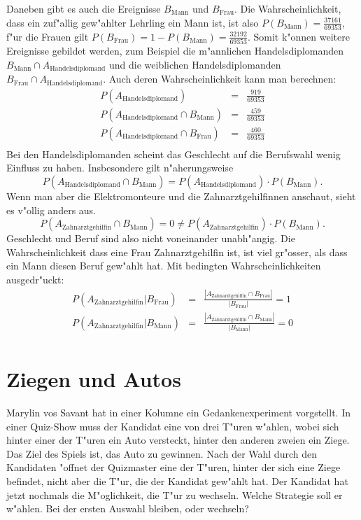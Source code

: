 Daneben gibt es auch die Ereignisse $B_{\text{Mann}}$ und $B_{\text{Frau}}$.
Die Wahrscheinlichkeit, dass ein zuf"allig gew"ahlter Lehrling ein Mann ist,
ist also $P(B_{\text{Mann}})=\frac{37161}{69353}$, f"ur die Frauen gilt
$P(B_{\text{Frau}})=1-P(B_{\text{Mann}})=\frac{32192}{69353}$.
Somit k"onnen weitere Ereignisse gebildet werden, zum Beispiel die
m"annlichen Handelsdiplomanden
$B_{\text{Mann}}\cap A_{\text{Handelsdiplomand}}$ und die
weiblichen Handelsdiplomanden
$B_{\text{Frau}}\cap A_{\text{Handelsdiplomand}}$.
Auch deren Wahrscheinlichkeit kann man berechnen:
\begin{eqnarray*}
P(A_{\text{Handelsdiplomand}})&=&\frac{919}{69353}\\
P(A_{\text{Handelsdiplomand}}\cap B_{\text{Mann}})&=&\frac{459}{69353}\\
P(A_{\text{Handelsdiplomand}}\cap B_{\text{Frau}})&=&\frac{460}{69353}\\
\end{eqnarray*}
Bei den Handelsdiplomanden scheint das Geschlecht auf die Berufswahl
wenig Einfluss zu haben. Insbesondere gilt n"aherungsweise
\[
P(A_{\text{Handelsdiplomand}}\cap B_{\text{Mann}})=P(A_{\text{Handelsdiplomand}})\cdot P(B_{\text{Mann}}).
\]
Wenn man aber die Elektromonteure und die Zahnarztgehilfinnen anschaut,
sieht es v"ollig anders aus.
\[
P(A_{\text{Zahnarztgehilfin}}\cap B_{\text{Mann}})=0\ne P(A_{\text{Zahnarztgehilfin}})\cdot P(B_{\text{Mann}}).
\]
Geschlecht und Beruf sind also nicht voneinander unabh"angig.
Die Wahrscheinlichkeit dass eine Frau Zahnarztgehilfin ist, ist viel
gr"osser, als dass ein Mann diesen Beruf gew"ahlt hat. Mit bedingten
Wahrscheinlichkeiten ausgedr"uckt:
\begin{eqnarray*}
P(A_{\text{Zahnarztgehilfin}}|B_{\text{Frau}})&=&\frac{|A_{\text{Zahnarztgehilfin}}\cap B_{\text{Frau}}|}{|B_{\text{Frau}}|}=1\\
P(A_{\text{Zahnarztgehilfin}}|B_{\text{Mann}})&=&\frac{|A_{\text{Zahnarztgehilfin}}\cap B_{\text{Mann}}|}{|B_{\text{Mann}}|}=0\\
\end{eqnarray*}

\section{Ziegen und Autos\label{ziegen:autos}}
Marylin vos Savant hat in einer Kolumne ein Gedankenexperiment vorgstellt.
In einer Quiz-Show muss der Kandidat eine von drei T"uren w"ahlen, wobei
sich hinter einer der T"uren ein Auto versteckt, hinter den anderen zweien
ein Ziege. Das Ziel des Spiels ist, das Auto zu gewinnen. Nach der Wahl
durch den Kandidaten "offnet der Quizmaster eine der T"uren, hinter der sich
eine Ziege befindet, nicht aber die T"ur, die der Kandidat gew"ahlt hat.
Der Kandidat hat jetzt nochmals die M"oglichkeit, die T"ur zu wechseln.
Welche Strategie soll er w"ahlen. Bei der ersten Auswahl bleiben, oder
wechseln?

